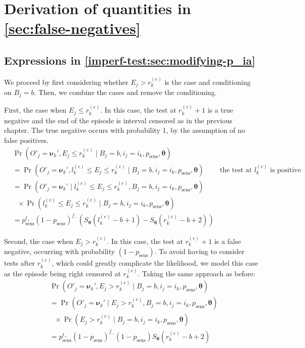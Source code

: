 \documentclass[referee,useAMS,usenatbib]{biom}
\DeclareMathOperator{\prob}{\mathrm{Pr}}
\renewcommand{\vec}[1]{\bm{#1}}
\newcommand{\psens}{p_\text{sens}}
\newcommand{\sched}{\mathcal{T}}
\begin{document}
\section{Derivation of quantities in \cref{sec:false-negatives}}

\subsection{Expressions in \cref{imperf-test:sec:modifying-p_ia}} \label{sec:p-ia-dash}

We proceed by first considering whether $E_j > r_k^{(e)}$ is the case and conditioning on $B_j = b$.
Then, we combine the cases and remove the conditioning.

First, the case when $E_j \leq r_k^{(e)}$.
In this case, the test at $r_k^{(e)}+1$ is a true negative and the end of the episode is interval censored as in the previous chapter.
The true negative occurs with probability 1, by the assumption of no false positives.
\begin{align}
&\prob(O'_j = \vec{\nu}_k', E_j \leq r_k^{(e)} \mid B_j = b, i_j = i_k, \psens, \vec{\theta}) \\
&= \prob(O'_j = \vec{\nu}_k', l_k^{(e)} \leq E_j \leq r_k^{(e)} \mid B_j = b, i_j = i_k, \psens, \vec{\theta}) &\text{the test at $l_k^{(e)}$ is positive} \\
&= \prob(O'_j = \vec{\nu}_k' \mid l_k^{(e)} \leq E_j \leq r_k^{(e)}, B_j = b, i_j = i_k, \psens, \vec{\theta}) \\
&\ \ \  \times \prob(l_k^{(e)} \leq E_j \leq r_k^{(e)} \mid B_j = b, i_j = i_k, \psens, \vec{\theta}) \\
&= p_\text{sens}^{t_+} (1 - p_\text{sens})^{f_-} \left( S_{\vec{\theta}}(l_k^{(e)} - b + 1) - S_{\vec{\theta}}(r_k^{(e)} - b + 2) \right)
\label{imperf-test:eq:ll-ei-lt-ri}
\end{align}

Second, the case when $E_j > r_k^{(e)}$.
In this case, the test at $r_k^{(e)}+1$ is a false negative, occurring with probability $(1 - p_\text{sens})$.
To avoid having to consider tests after $r_k^{(e)}$, which could greatly complicate the likelihood, we model this case as the episode being right censored at $r_k^{(e)}$.
Taking the same approach as before:
\begin{align}
&\prob(O'_j = \vec{\nu}_k', E_j > r_k^{(e)} \mid B_j = b, i_j = i_k, \psens, \vec{\theta}) \\
&= \prob(O'_j = \vec{\nu}_k' \mid E_j > r_k^{(e)}, B_j = b, i_j = i_k, \psens, \vec{\theta}) \\
  &\ \ \  \times \prob(E_j > r_k^{(e)} \mid B_j = b, i_j = i_k, \psens, \vec{\theta}) \\
&= p_\text{sens}^{t_+} (1 - p_\text{sens})^{f_-} (1 - p_\text{sens}) S_{\vec{\theta}}(r_k^{(e)} - b + 2)
\label{imperf-test:eq:ll-ei-gt-ri}
\end{align}
\end{document}
